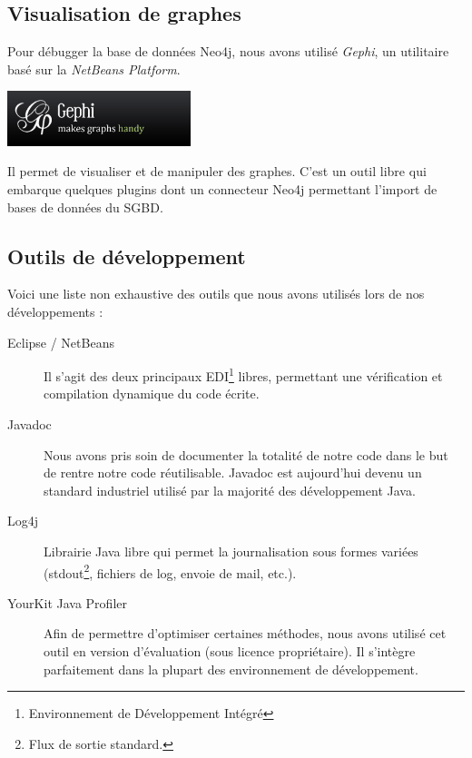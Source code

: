 \subsection{Visualisation de graphes}

Pour débugger la base de données Neo4j, nous avons utilisé \emph{Gephi}, un utilitaire basé sur la \emph{NetBeans Platform}.

\begin{center}
\includegraphics[width=0.4\textwidth]{files/outils/gephi}
\end{center}

Il permet de visualiser et de manipuler des graphes. C'est un outil libre qui embarque quelques plugins dont un connecteur Neo4j permettant l'import de bases de données du SGBD.

\subsection{Outils de développement}
Voici une liste non exhaustive des outils que nous avons utilisés lors de nos développements :
\begin{description}
\item[Eclipse / NetBeans] Il s'agit des deux principaux EDI\footnote{Environnement de Développement Intégré} libres, permettant une vérification et compilation dynamique du code écrite.
\item[Javadoc] Nous avons pris soin de documenter la totalité de notre code dans le but de rentre notre code réutilisable. Javadoc est aujourd'hui devenu un standard industriel utilisé par la majorité des développement Java.
\item[Log4j] Librairie Java libre qui permet la journalisation sous formes variées (stdout\footnote{Flux de sortie standard.}, fichiers de log, envoie de mail, etc.).
\item[YourKit Java Profiler] Afin de permettre d'optimiser certaines méthodes, nous avons utilisé cet outil en version d'évaluation (sous licence propriétaire). Il s'intègre parfaitement dans la plupart des environnement de développement.
\end{description}